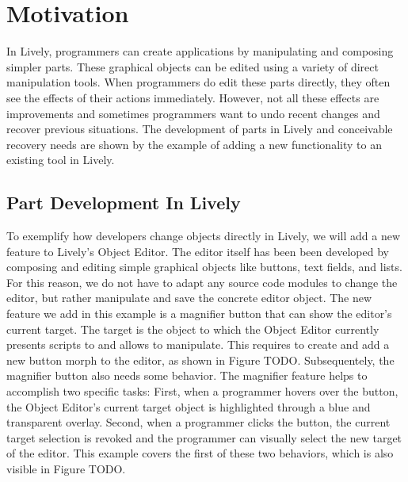 \chapter{Motivation} \label{chapter:MOTIVATION}

In Lively, programmers can create applications by manipulating and composing simpler parts.
These graphical objects can be edited using a variety of direct manipulation tools.
When programmers do edit these parts directly, they often see the effects of their actions immediately.
However, not all these effects are improvements and sometimes programmers want to undo recent changes and recover previous situations.
The development of parts in Lively and conceivable recovery needs are shown by the example of adding a new functionality to an existing tool in Lively.


\section{Part Development In Lively}

To exemplify how developers change objects directly in Lively, we will add a new feature to Lively's Object Editor.
The editor itself has been been developed by composing and editing simple graphical objects like buttons, text fields, and lists.
For this reason, we do not have to adapt any source code modules to change the editor, but rather manipulate and save the concrete editor object.
The new feature we add in this example is a magnifier button that can show the editor's current target.
The target is the object to which the Object Editor currently presents scripts to and allows to manipulate.
This requires to create and add a new button morph to the editor, as shown in Figure TODO.
Subsequentely, the magnifier button also needs some behavior.
The magnifier feature helps to accomplish two specific tasks: First, when a programmer hovers over the button, the Object Editor's current target object is highlighted through a blue and transparent overlay. Second, when a programmer clicks the button, the current target selection is revoked and the programmer can visually select the new target of the editor.
This example covers the first of these two behaviors, which is also visible in Figure TODO.





